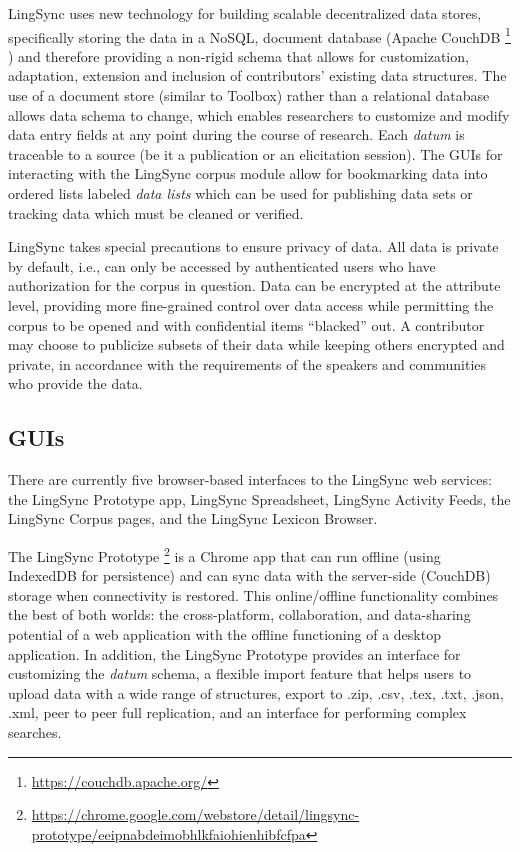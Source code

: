 \documentclass[11pt]{article}
\begin{document}
LingSync uses new technology for building scalable decentralized data stores,
specifically storing the data in a NoSQL, document database (Apache CouchDB%
\footnote{\url{https://couchdb.apache.org/}}%
) and therefore providing a non-rigid schema that allows for customization,
adaptation, extension and inclusion of contributors' existing data structures.
The use of a document store (similar to Toolbox) rather than a relational
database allows data schema to change, which enables researchers to customize
and modify data entry fields at any point during the course of research. Each
\emph{datum} is traceable to a source (be it a publication or an elicitation
session). The GUIs for interacting with the LingSync corpus module allow for
bookmarking data into ordered lists labeled \textit{data lists} which can be
used for publishing data sets or tracking data which must be cleaned or
verified.

LingSync takes special precautions to ensure privacy of data. All data is
private by default, i.e., can only be accessed by authenticated users who have
authorization for the corpus in question. Data can be encrypted at the
attribute level, providing more fine-grained control over data access while
permitting the corpus to be opened and with confidential items ``blacked'' out.
A contributor may choose to publicize subsets of their data while keeping
others encrypted and private, in accordance with the requirements of the
speakers and communities who provide the data.


\subsection{GUIs}

There are currently five browser-based interfaces to the LingSync web services:
the LingSync Prototype app, LingSync Spreadsheet, LingSync Activity Feeds, the
LingSync Corpus pages, and the LingSync Lexicon Browser.

The LingSync Prototype%
\footnote{\url{https://chrome.google.com/webstore/detail/lingsync-prototype/eeipnabdeimobhlkfaiohienhibfcfpa}} %
is a Chrome app that can run offline (using IndexedDB for persistence) and can
sync data with the server-side (CouchDB) storage when connectivity is restored.
This online/offline functionality combines the best of both worlds: the
cross-platform, collaboration, and data-sharing potential of a web application
with the offline functioning of a desktop application. In addition, the
LingSync Prototype provides an interface for customizing the \emph{datum}
schema, a flexible import feature that helps users to upload data with a wide
range of structures, export to .zip, .csv, .tex, .txt, .json, .xml, peer to
peer full replication, and an interface for performing complex searches.
\end{document}
